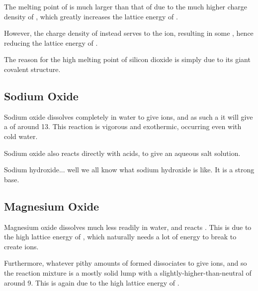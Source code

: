 			The melting point of  is much larger than that of  due to the much higher charge density of , which
			greatly increases the lattice energy of .

			However, the  charge density of  instead serves to  the  ion, resulting
			in some , hence reducing the lattice energy of .

			The reason for the high melting point of silicon dioxide is simply due to its giant covalent structure.



		\pagebreak
		\subsection{Sodium Oxide}

			Sodium oxide dissolves completely in water to give  ions, and as such a it will give a \pH{} of around \num{13}. This
			reaction is vigorous and exothermic, occurring even with cold water.

			Sodium oxide also reacts directly with acids, to give an aqueous salt solution.


			Sodium hydroxide... well we all know what sodium hydroxide is like. It is a strong base.



		\subsection{Magnesium Oxide}

			Magnesium oxide dissolves much less readily in water, and reacts . This is due to the high lattice energy of
			, which naturally needs a lot of energy to break to create ions.

			Furthermore, whatever pithy amounts of  formed  dissociates to give  ions, and so the reaction
			mixture is a mostly solid lump with a slightly-higher-than-neutral \pH{} of around \num{9}. This is again due to the high lattice
			energy of .

